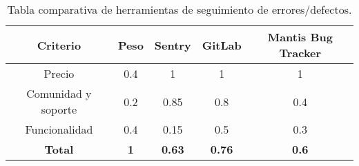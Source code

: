 \begin{table}[H]
	\begin{center}
		\begin{tabular}{|c||c|c|c|c|}
			\hline
			Criterio & Peso & Sentry & GitLab & Mantis Bug Tracker \\
			\hline \hline
			Precio & 0.4 & 1 & 1 & 1 \\ \hline
			Comunidad y soporte & 0.2 & 0.85 & 0.8 & 0.4 \\ \hline
			Funcionalidad & 0.4 & 0.15 & 0.5 & 0.3 \\ \hline
			\textbf{Total} & \textbf{1} & \textbf{0.63} & \textbf{0.76} & \textbf{0.6} \\ \hline
		\end{tabular}
		\caption{Tabla comparativa de herramientas de seguimiento de errores/defectos.}
		\label{tabla:tabla5}
	\end{center}
\end{table}




%
%

       
